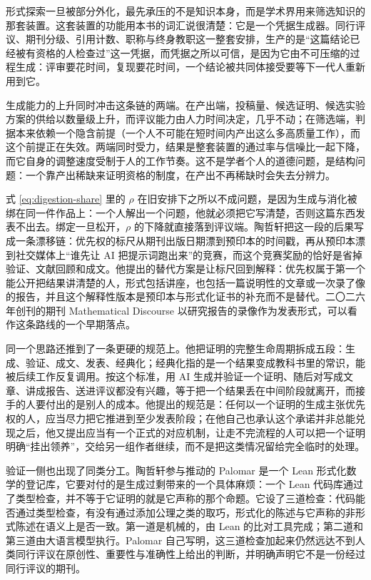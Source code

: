 
形式探索一旦被部分外化，最先承压的不是知识本身，而是学术界用来筛选知识的那套装置。这套装置的功能用本书的词汇说很清楚：它是一个凭据生成器。同行评议、期刊分级、引用计数、职称与终身教职这一整套安排，生产的是“这篇结论已经被有资格的人检查过”这一凭据，而凭据之所以可信，是因为它由不可压缩的过程生成：评审要花时间，复现要花时间，一个结论被共同体接受要等下一代人重新用到它。

生成能力的上升同时冲击这条链的两端。在产出端，投稿量、候选证明、候选实验方案的供给以数量级上升，而评议能力由人力时间决定，几乎不动；在筛选端，判据本来依赖一个隐含前提（一个人不可能在短时间内产出这么多高质量工作），而这个前提正在失效。两端同时受力，结果是整套装置的通过率与信噪比一起下降，而它自身的调整速度受制于人的工作节奏。这不是学者个人的道德问题，是结构问题：一个靠产出稀缺来证明资格的制度，在产出不再稀缺时会失去分辨力。

式 \eqref{eq:digestion-share} 里的 $\rho$ 在旧安排下之所以不成问题，是因为生成与消化被绑在同一件作品上：一个人解出一个问题，他就必须把它写清楚，否则这篇东西发表不出去。绑定一旦松开，$\rho$ 的下降就直接落到评议端。陶哲轩把这一段的后果写成一条漂移链：优先权的标尺从期刊出版日期漂到预印本的时间戳，再从预印本漂到社交媒体上“谁先让 AI 把提示词跑出来”的竞赛，而这个竞赛奖励的恰好是省掉验证、文献回顾和成文。他提出的替代方案是让标尺回到解释：优先权属于第一个能公开把结果讲清楚的人，形式包括讲座，也包括一篇说明性的文章或一次录了像的报告，并且这个解释性版本是预印本与形式化证书的补充而不是替代。二〇二六年创刊的期刊 Mathematical Discourse 以研究报告的录像作为发表形式，可以看作这条路线的一个早期落点。\cite{tao2026aiviews,tao2026discourse}

同一个思路还推到了一条更硬的规范上。他把证明的完整生命周期拆成五段：生成、验证、成文、发表、经典化；经典化指的是一个结果变成教科书里的常识，能被后续工作反复调用。按这个标准，用 AI 生成并验证一个证明、随后对写成文章、讲成报告、送进评议都没有兴趣，等于把一个结果丢在中间阶段就离开，而接手的人要付出的是别人的成本。他提出的规范是：任何以一个证明的生成主张优先权的人，应当尽力把它推进到至少发表阶段；在他自己也承认这个承诺并非总能兑现之后，他又提出应当有一个正式的对应机制，让走不完流程的人可以把一个证明明确“挂出领养”，交给另一组作者继续，而不是把这类情况留给完全临时的处理。\cite{tao2026aiviews}

验证一侧也出现了同类分工。陶哲轩参与推动的 Palomar 是一个 Lean 形式化数学的登记库，它要对付的是生成过剩带来的一个具体麻烦：一个 Lean 代码库通过了类型检查，并不等于它证明的就是它声称的那个命题。它设了三道检查：代码能否通过类型检查，有没有通过添加公理之类的取巧，形式化的陈述与它声称的非形式陈述在语义上是否一致。第一道是机械的，由 Lean 的比对工具完成；第二道和第三道由大语言模型执行。Palomar 自己写明，这三道检查加起来仍然远达不到人类同行评议在原创性、重要性与准确性上给出的判断，并明确声明它不是一份经过同行评议的期刊。\cite{tao2026palomar}


